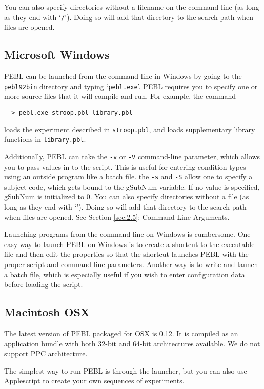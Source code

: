 You can also specify directories without a filename on the command-line (as long as they end with `\texttt{/}').  Doing so will add that directory to the search path when files are opened.

\subsection{ Microsoft Windows}

PEBL can be launched from the command line in Windows by going to the
\texttt{pebl\char92bin} directory and typing `\texttt{pebl.exe}'.
PEBL requires you to specify one or more source files that it will
compile and run.  For example, the command
\begin{verbatim}
  > pebl.exe stroop.pbl library.pbl
\end{verbatim}
loads the experiment described in \texttt{stroop.pbl}, and loads supplementary library functions in \texttt{library.pbl}.

Additionally, PEBL can take the \texttt{-v} or \texttt{-V}
command-line parameter, which allows you to pass values in to the
script.  This is useful for entering condition types using an outside
program like a batch file. the \texttt{-s} and \texttt{-S} allow one
to specify a subject code, which gets bound to the gSubNum variable.
If no value is specified, gSubNum is initialized to 0.  You can also
specify directories without a file (as long as they end with
`\texttt{}').  Doing so will add that directory to the search
path when files are opened. See Section \ref{sec:2.5}: Command-Line
Arguments.

Launching programs from the command-line on Windows is cumbersome.
One easy way to launch PEBL on Windows is to create a shortcut to the
executable file and then edit the properties so that the shortcut
launches PEBL with the proper script and command-line parameters.
Another way is to write and launch a batch file, which is especially
useful if you wish to enter configuration data before loading the
script.


\subsection{ Macintosh OSX}

The latest version of PEBL packaged for OSX is 0.12. It is compiled as an application bundle with both 32-bit and 64-bit architectures available. We do not support PPC architecture.


The simplest way to run PEBL is through the launcher, but you can also use Applescript
to create your own sequences of experiments.

